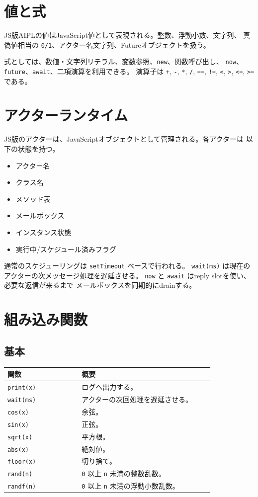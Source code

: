 \documentclass[11pt,a4paper,uplatex,dvipdfmx]{jsarticle}
\begin{document}
\section{値と式}

JS版AIPLの値はJavaScript値として表現される。整数、浮動小数、文字列、
真偽値相当の \texttt{0/1}、アクター名文字列、Futureオブジェクトを扱う。

式としては、数値・文字列リテラル、変数参照、\texttt{new}、関数呼び出し、
\texttt{now}、\texttt{future}、\texttt{await}、二項演算を利用できる。
演算子は \texttt{+}, \texttt{-}, \texttt{*}, \texttt{/}, \texttt{==},
\texttt{!=}, \texttt{<}, \texttt{>}, \texttt{<=}, \texttt{>=} である。

\section{アクターランタイム}

JS版のアクターは、JavaScriptオブジェクトとして管理される。各アクターは
以下の状態を持つ。

\begin{itemize}
  \item アクター名
  \item クラス名
  \item メソッド表
  \item メールボックス
  \item インスタンス状態
  \item 実行中/スケジュール済みフラグ
\end{itemize}

通常のスケジューリングは \texttt{setTimeout} ベースで行われる。
\texttt{wait(ms)} は現在のアクターの次メッセージ処理を遅延させる。
\texttt{now} と \texttt{await} はreply slotを使い、必要な返信が来るまで
メールボックスを同期的にdrainする。

\section{組み込み関数}

\subsection{基本}

\begin{longtable}{p{0.32\linewidth}p{0.58\linewidth}}
\toprule
関数 & 概要 \\
\midrule
\texttt{print(x)} & ログへ出力する。 \\
\texttt{wait(ms)} & アクターの次回処理を遅延させる。 \\
\texttt{cos(x)} & 余弦。 \\
\texttt{sin(x)} & 正弦。 \\
\texttt{sqrt(x)} & 平方根。 \\
\texttt{abs(x)} & 絶対値。 \\
\texttt{floor(x)} & 切り捨て。 \\
\texttt{rand(n)} & \texttt{0} 以上 \texttt{n} 未満の整数乱数。 \\
\texttt{randf(n)} & \texttt{0} 以上 \texttt{n} 未満の浮動小数乱数。 \\
\bottomrule
\end{longtable}
\end{document}

